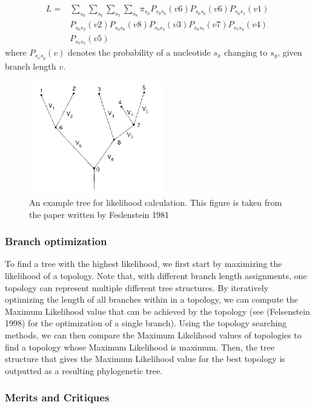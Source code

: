 \documentclass[10pt,twocolumn]{article}
\begin{document}
\begin{align*}
L = & \sum\limits_{s_0}  \sum\limits_{s_6}  \sum\limits_{s_7}  \sum\limits_{s_8} \pi_{s_0} P_{s_0 s_6}(v6) P_{s_0 s_6}(v6) P_{s_6 s_1}(v1) 
\\ & P_{s_6 s_2}(v2) P_{s_0 s_8}(v8) P_{s_8 s_3}(v3) P_{s_8 s_7}(v7) P_{s_7 s_4}(v4)
\\ & P_{s_7 s_5}(v5)
\end{align*}
where $P_{s_x s_y}(v)$ denotes the probability of a nucleotide $s_x$ changing to $s_y$, given branch length $v$.

\begin{figure}
\begin{centering}
  \includegraphics{media/ml.png}
  \caption{An example tree for likelihood calculation. This figure is taken from the paper written by Feslenstein 1981}
  \label{fig:ml}
\end{centering}
\end{figure}

\subsubsection*{Branch optimization}
To find a tree with the highest likelihood, we first start by maximizing the likelihood of a topology. Note that, with different branch length assignments, one topology can represent multiple different tree structures. By iteratively optimizing the length of all branches within in a topology, we can compute the Maximum Likelihood value that can be achieved by the topology (see (Felsenstein 1998) for the optimization of a single branch). Using the topology searching methods, we can then compare the Maximum Likelihood values of topologies to find a topology whose Maximum Likelihood is maximum. Then, the tree structure that gives the Maximum Likelihood value for the best topology is outputted as a resulting phylogenetic tree.

\subsubsection*{Merits and Critiques} 
\end{document}

